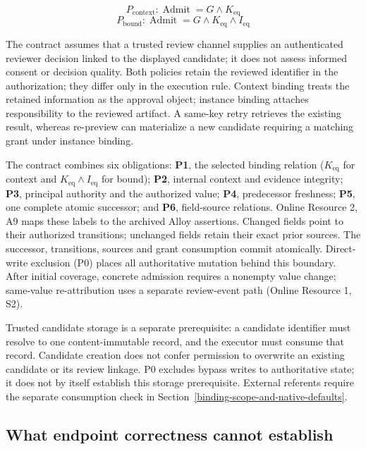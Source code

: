 \documentclass[pdflatex,sn-basic]{sn-jnl}
\begin{document}
\[
P_{\mathrm{context}}: \operatorname{Admit} = G \land  K_{\mathrm{eq}}
\] \[
P_{\mathrm{bound}}:   \operatorname{Admit} = G \land  K_{\mathrm{eq}} \land  I_{\mathrm{eq}}
\]

The contract assumes that a trusted review channel supplies an authenticated reviewer decision linked to the displayed candidate; it does not assess informed consent or decision quality. Both policies retain the reviewed identifier in the authorization; they differ only in the execution rule. Context binding treats the retained information as the approval object; instance binding attaches responsibility to the reviewed artifact. A same-key retry retrieves the existing result, whereas re-preview can materialize a new candidate requiring a matching grant under instance binding.

The contract combines six obligations: \textbf{P1}, the selected binding relation ($K_{\mathrm{eq}}$ for context and $K_{\mathrm{eq}}\land I_{\mathrm{eq}}$ for bound); \textbf{P2}, internal context and evidence integrity; \textbf{P3}, principal authority and the authorized value; \textbf{P4}, predecessor freshness; \textbf{P5}, one complete atomic successor; and \textbf{P6}, field-source relations. Online Resource 2, A9 maps these labels to the archived Alloy assertions. Changed fields point to their authorized transitions; unchanged fields retain their exact prior sources. The successor, transitions, sources and grant consumption commit atomically. Direct-write exclusion (P0) places all authoritative mutation behind this boundary. After initial coverage, concrete admission requires a nonempty value change; same-value re-attribution uses a separate review-event path (Online Resource 1, S2).

Trusted candidate storage is a separate prerequisite: a candidate identifier must resolve to one content-immutable record, and the executor must consume that record. Candidate creation does not confer permission to overwrite an existing candidate or its review linkage. P0 excludes bypass writes to authoritative state; it does not by itself establish this storage prerequisite. External referents require the separate consumption check in Section~\ref{binding-scope-and-native-defaults}.

\subsection{What endpoint correctness cannot establish}\label{what-endpoint-correctness-cannot-establish}
\end{document}
